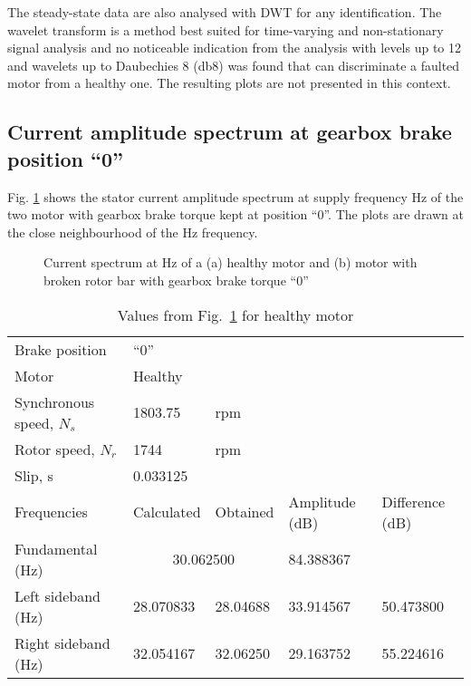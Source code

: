 \documentclass[a4paper,11pt]{report}
\begin{document}
The steady-state data are also analysed with DWT for any identification. The wavelet transform is a method best suited for time-varying and non-stationary signal analysis and no noticeable indication from the analysis with levels up to 12 and wavelets up to Daubechies 8 (db8) was found that can discriminate a faulted motor from a healthy one. The resulting plots are not presented in this context.

\clearpage
\subsection{Current amplitude spectrum at gearbox brake position ``0''}
Fig. \ref{hb030ss} shows the stator current amplitude spectrum at supply frequency \unit[30]{Hz} of the two motor with gearbox brake torque kept at position ``0''. The plots are drawn at the close neighbourhood of the \unit[30]{Hz} frequency.

\begin{figure}[h]
\centering
\subfigure[]{\texttt{[image: h030]}}
\subfigure[]{\texttt{[image: b030]}}
\caption{Current spectrum at \unit[30]{Hz} of a (a) healthy motor and (b) motor with broken rotor bar  with gearbox brake torque ``0''} \label{hb030ss}
\end{figure}

\begin{table}[h]
\centering
\begin{tabular}{lllll}
Brake position	& ``0'' & & & \\			
Motor &	\multicolumn{4}{l}{Healthy} \\ 
Synchronous speed, $N_{s}$	& 1803.75 & rpm & & \\			 
Rotor speed, $N_{r}$	& 1744	& rpm& & \\		
Slip, s	& \multicolumn{4}{l}{0.033125} \\			
Frequencies & Calculated & Obtained & Amplitude (dB) & Difference (dB) \\
Fundamental (Hz)& \multicolumn{2}{c}{30.062500}	& 84.388367 &  \\ 
Left sideband (Hz) & 28.070833 & 28.04688 & 33.914567 & 50.473800 \\
Right sideband (Hz)& 32.054167 & 32.06250 & 29.163752 & 55.224616 
\end{tabular}
\caption{Values from Fig.~\ref{hb030ss} for healthy motor} \label{h030sst}
\end{table}
\end{document}
